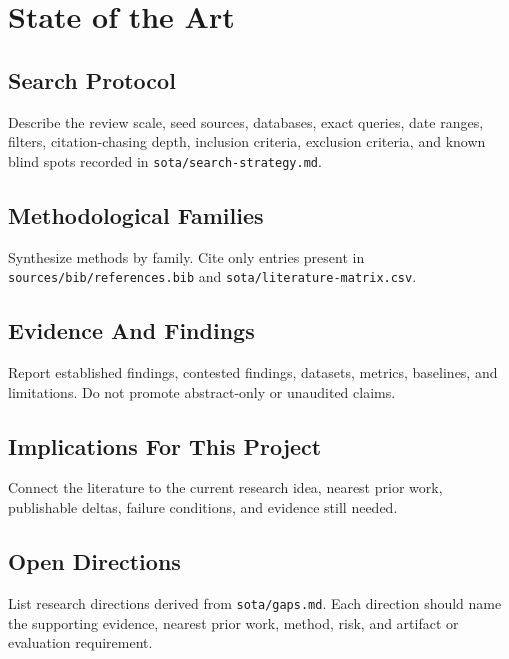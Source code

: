 \section{State of the Art}
\label{sec:sota}

\subsection{Search Protocol}
\label{sec:sota-search-protocol}
Describe the review scale, seed sources, databases, exact queries, date ranges,
filters, citation-chasing depth, inclusion criteria, exclusion criteria, and
known blind spots recorded in \texttt{sota/search-strategy.md}.

\subsection{Methodological Families}
\label{sec:sota-method-families}
Synthesize methods by family. Cite only entries present in
\texttt{sources/bib/references.bib} and \texttt{sota/literature-matrix.csv}.

\subsection{Evidence And Findings}
\label{sec:sota-findings}
Report established findings, contested findings, datasets, metrics, baselines,
and limitations. Do not promote abstract-only or unaudited claims.

\subsection{Implications For This Project}
\label{sec:sota-project-implications}
Connect the literature to the current research idea, nearest prior work,
publishable deltas, failure conditions, and evidence still needed.

\subsection{Open Directions}
\label{sec:sota-open-directions}
List research directions derived from \texttt{sota/gaps.md}. Each direction
should name the supporting evidence, nearest prior work, method, risk, and
artifact or evaluation requirement.
